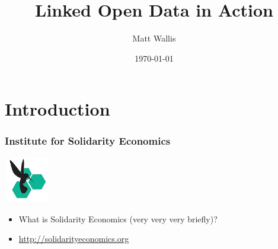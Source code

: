 
\usepackage{beamerthemesplit}
\usepackage{textpos} 
\usepackage{hyperref}
\usepackage{graphicx}
\usepackage{calc}
\newlength{\popupimagewidth}

\setlength{\popupimagewidth}{\textwidth*3/5}


\title{Linked Open Data in Action}
\author{Matt Wallis}
\date{\today}



\frame{\titlepage}

\section[Outline]{}
\frame{\tableofcontents}

\section{Introduction}
\frame
{
  \frametitle{Institute for Solidarity Economics}
  \begin{center}
    \includegraphics[height=2cm,width=2cm]{ise-logo.jpg}
  \end{center}
  \begin{itemize}
    \item<1-> What is Solidarity Economics (very very very briefly)?
    \item<2-> \url{http://solidarityeconomics.org}
  \end{itemize}
}
